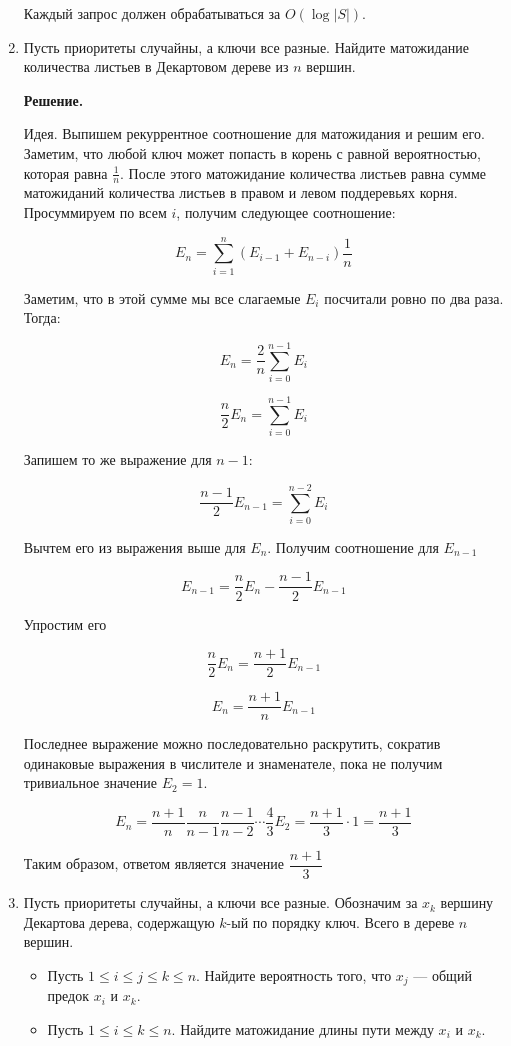 \begin{enumerate}
	Каждый запрос должен обрабатываться за $O(\log |S|)$.
	
	\item Пусть приоритеты случайны, а ключи все разные. Найдите матожидание количества листьев в
	Декартовом дереве из $n$ вершин.
	
	\textbf{Решение.}
	
	Идея. Выпишем рекуррентное соотношение для матожидания и решим его.
	Заметим, что любой ключ может попасть в корень с равной вероятностью, которая равна 
	$\frac{1}{n}$. После этого матожидание количества листьев равна сумме матожиданий количества листьев в правом и левом поддеревьях корня. Просуммируем по всем $i$, получим следующее соотношение:
	
	$$E_n = \sum\limits_{i = 1}^{n} (E_{i - 1} + E_{n - i}) \frac{1}{n}$$
	
	Заметим, что в этой сумме мы все слагаемые $E_i$ посчитали ровно по два раза. Тогда:
	
	$$E_n = \frac{2}{n} \sum\limits_{i = 0}^{n - 1} E_i$$
	
	$$\frac{n}{2} E_n = \sum\limits_{i = 0}^{n - 1} E_i$$
	
	Запишем то же выражение для $n - 1$:
	
	$$\frac{n - 1}{2}E_{n - 1} = \sum\limits_{i = 0}^{n - 2} E_i$$

	Вычтем его из выражения выше для $E_n$. Получим соотношение для $E_{n - 1}$
	
	$$E_{n - 1} = \frac{n}{2} E_{n} - \frac{n - 1}{2} E_{n - 1}$$
	
	Упростим его
	
	$$\frac{n}{2} E_n = \frac{n + 1}{2}E_{n - 1}$$
	
	$$E_n = \frac{n + 1}{n} E_{n - 1}$$
	
	Последнее выражение можно последовательно раскрутить, сократив одинаковые выражения в числителе и знаменателе, пока не получим тривиальное значение $E_2 = 1$.
	
	$$E_n = \frac{n + 1}{n} \frac{n}{n - 1} \frac{n - 1}{n - 2} \cdots \frac{4}{3} E_2 = \frac{n + 1}{3} \cdot 1 = \frac{n + 1}{3}$$
	
	Таким образом, ответом является значение $\dfrac{n + 1}{3}$
	
	\item Пусть приоритеты случайны, а ключи все разные. Обозначим за $x_k$ вершину Декартова дерева,	содержащую $k$-ый по порядку ключ. Всего в дереве $n$ вершин.
	\begin{itemize}
		\item Пусть $1 \leqslant i \leqslant j \leqslant k \leqslant n$. Найдите вероятность того, что $x_j$ — общий предок $x_i$ и $x_k$.
		\item Пусть $1 \leqslant i \leqslant k \leqslant n$. Найдите матожидание длины пути между $x_i$ и $x_k$.
	\end{itemize}
	

\end{enumerate}
